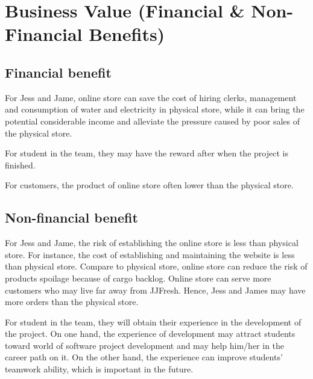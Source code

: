 \documentclass{report}
\begin{document}
\section{Business Value (Financial \& Non-Financial Benefits)}
\subsection{Financial benefit}
For Jess and Jame, online store can save the cost of hiring clerks, management and consumption of water and electricity in physical store, while it can bring the potential considerable income and alleviate the pressure caused by poor sales of the physical store.

For student in the team, they may have the reward after when the project is finished.

For customers, the product of online store often lower than the physical store.

\subsection{Non-financial benefit}
For Jess and Jame, the risk of establishing the online store is less than physical store. For instance, the cost of establishing and maintaining the website is less than physical store. Compare to physical store, online store can reduce the risk of products spoilage because of cargo backlog. Online store can serve more customers who may live far away from JJFresh. Hence, Jess and James may have more orders than the physical store.

For student in the team, they will obtain their experience in the development of the project. On one hand, the experience of development may attract students toward world of software project development and may help him/her in the career path on it. On the other hand, the experience can improve students' teamwork ability, which is important in the future.
\end{document}

